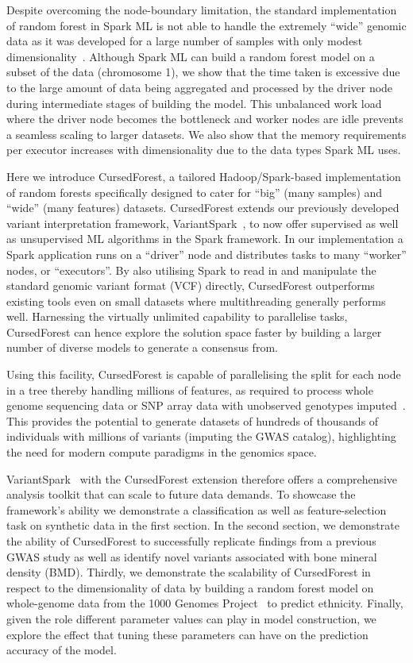 \documentclass[a4paper]{amsart}
\begin{document}
Despite overcoming the node-boundary limitation, the standard implementation of random forest in Spark ML
is not able to handle the extremely ``wide'' genomic data as it was developed for a large number of samples
with only modest dimensionality~\cite{NIPS2016_6366}.  Although Spark ML can build a random forest model on a subset of the data (chromosome
1), we show that the time taken is excessive due to the large amount of data being aggregated and processed by the driver node during
intermediate stages of building the model.  This unbalanced work load where the driver
node becomes the bottleneck and worker nodes are idle prevents a seamless scaling to larger datasets. We also show that the memory
requirements per executor increases with dimensionality due to the data types Spark ML uses.%
  
Here we introduce CursedForest, a tailored Hadoop/Spark-based implementation of random forests specifically designed to cater
for ``big'' (many samples) and ``wide'' (many features) datasets. 
CursedForest extends our previously developed variant interpretation framework, VariantSpark~\cite{OBrien2015}, to now offer
supervised as well as unsupervised ML algorithms in the Spark framework.
In our implementation a Spark application runs on a ``driver'' node and
distributes tasks to many ``worker'' nodes, or ``executors''. 
By also utilising Spark to read in and manipulate the standard genomic variant format (VCF)
directly, CursedForest outperforms existing tools even on small datasets where multithreading generally performs
well. Harnessing the virtually unlimited capability to parallelise tasks, CursedForest can hence explore the solution 
space faster by building a larger number of diverse models to generate a consensus from. 

Using this facility, CursedForest is capable of parallelising the split for each node in a tree thereby handling millions 
of features, as required to process whole genome sequencing data or SNP array data with unobserved genotypes 
imputed~\cite{Howie2012}.  This provides the potential to generate datasets of hundreds of thousands of individuals 
with millions of variants (imputing the GWAS catalog), highlighting the need for modern
compute paradigms in the genomics space.

VariantSpark~\cite{OBrien2015} with the CursedForest extension therefore offers a
comprehensive analysis toolkit that can scale to future data demands. To showcase the framework's ability we demonstrate
a classification as well as feature-selection task on synthetic data in the first section. In the second section, we demonstrate the ability of
CursedForest to successfully replicate findings from a previous GWAS study as well as identify novel variants associated with bone 
mineral density (BMD). 
Thirdly, we demonstrate the scalability of CursedForest in respect to the dimensionality of data by building a random
forest model on whole-genome data from the 1000 Genomes Project~\cite{1KG2012} to predict ethnicity.
Finally, given the role different parameter values can play in model construction, we explore the effect that tuning these
parameters can have on the prediction accuracy of the model.
\end{document}
